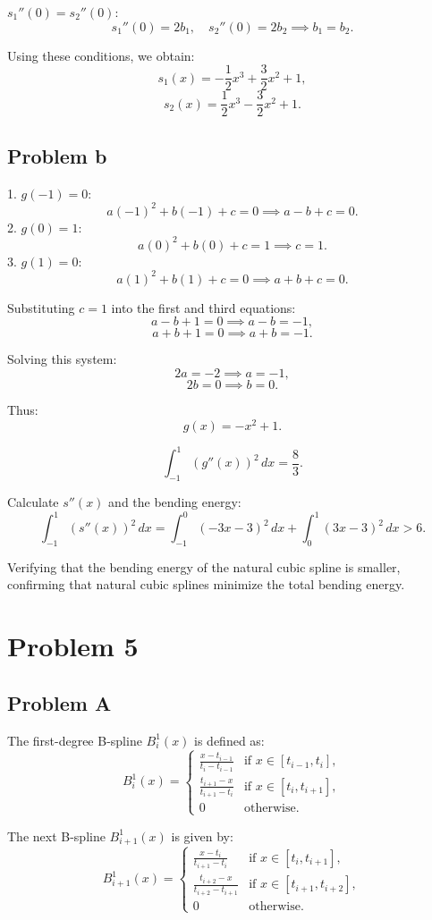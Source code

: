\documentclass{article}
\begin{document}
\( s_1''(0) = s_2''(0) \):
   \[
   s_1''(0) = 2b_1, \quad s_2''(0) = 2b_2 \implies b_1 = b_2.
   \]

Using these conditions, we obtain:
\[
s_1(x) = -\frac{1}{2} x^3 + \frac{3}{2} x^2 + 1,
\]
\[
s_2(x) = \frac{1}{2} x^3 - \frac{3}{2} x^2 + 1.
\]

\subsection{Problem b}
1. \( g(-1) = 0 \):
   \[
   a(-1)^2 + b(-1) + c = 0 \implies a - b + c = 0.
   \]
2. \( g(0) = 1 \):
   \[
   a(0)^2 + b(0) + c = 1 \implies c = 1.
   \]
3. \( g(1) = 0 \):
   \[
   a(1)^2 + b(1) + c = 0 \implies a + b + c = 0.
   \]

Substituting \( c = 1 \) into the first and third equations:
\[
a - b + 1 = 0 \implies a - b = -1,
\]
\[
a + b + 1 = 0 \implies a + b = -1.
\]

Solving this system:
\[
2a = -2 \implies a = -1,
\]
\[
2b = 0 \implies b = 0.
\]

Thus:
\[
g(x) = -x^2 + 1.
\]

\[
\int_{-1}^1 \left( g''(x) \right)^2 \, dx = \frac{8}{3}.
\]

Calculate \( s''(x) \) and the bending energy:
\[
\int_{-1}^1 \left( s''(x) \right)^2 \, dx = \int_{-1}^0 \left( -3x - 3 \right)^2 \, dx + \int_{0}^1 \left( 3x - 3 \right)^2 \, dx > 6.
\]

Verifying that the bending energy of the natural cubic spline is smaller, confirming that natural cubic splines minimize the total bending energy.


\section{Problem 5}
\subsection{Problem A}

The first-degree B-spline \( B_i^1(x) \) is defined as:
\[
B_i^1(x) = \begin{cases}
\frac{x - t_{i-1}}{t_i - t_{i-1}} & \text{if } x \in [t_{i-1}, t_i], \\[10pt]
\frac{t_{i+1} - x}{t_{i+1} - t_i} & \text{if } x \in [t_i, t_{i+1}], \\[10pt]
0 & \text{otherwise}.
\end{cases}
\]

The next B-spline \( B_{i+1}^1(x) \) is given by:
\[
B_{i+1}^1(x) = \begin{cases}
\frac{x - t_i}{t_{i+1} - t_i} & \text{if } x \in [t_i, t_{i+1}], \\[10pt]
\frac{t_{i+2} - x}{t_{i+2} - t_{i+1}} & \text{if } x \in [t_{i+1}, t_{i+2}], \\[10pt]
0 & \text{otherwise}.
\end{cases}
\]
\end{document}
